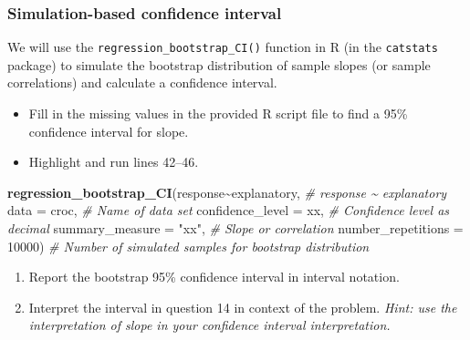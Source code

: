 \documentclass[
]{report}
\newenvironment{Shaded}{\begin{snugshade}}{\end{snugshade}}
\newcommand{\AttributeTok}[1]{\textcolor[rgb]{0.13,0.29,0.53}{#1}}
\newcommand{\CommentTok}[1]{\textcolor[rgb]{0.56,0.35,0.01}{\textit{#1}}}
\newcommand{\DecValTok}[1]{\textcolor[rgb]{0.00,0.00,0.81}{#1}}
\newcommand{\FunctionTok}[1]{\textcolor[rgb]{0.13,0.29,0.53}{\textbf{#1}}}
\newcommand{\NormalTok}[1]{#1}
\newcommand{\SpecialCharTok}[1]{\textcolor[rgb]{0.81,0.36,0.00}{\textbf{#1}}}
\newcommand{\StringTok}[1]{\textcolor[rgb]{0.31,0.60,0.02}{#1}}
\begin{document}
\subsubsection*{Simulation-based confidence interval}\label{simulation-based-confidence-interval-1}

We will use the \texttt{regression\_bootstrap\_CI()} function in R (in the \texttt{catstats} package) to simulate the bootstrap distribution of sample slopes (or sample correlations) and calculate a confidence interval.

\begin{itemize}
\item
  Fill in the missing values in the provided R script file to find a 95\% confidence interval for slope.
\item
  Highlight and run lines 42--46.
\end{itemize}

\begin{Shaded}
\begin{Highlighting}[]
\FunctionTok{regression\_bootstrap\_CI}\NormalTok{(response}\SpecialCharTok{\textasciitilde{}}\NormalTok{explanatory, }\CommentTok{\# response \textasciitilde{} explanatory}
   \AttributeTok{data =}\NormalTok{ croc, }\CommentTok{\# Name of data set}
   \AttributeTok{confidence\_level =}\NormalTok{ xx, }\CommentTok{\# Confidence level as decimal}
   \AttributeTok{summary\_measure =} \StringTok{"xx"}\NormalTok{, }\CommentTok{\# Slope or correlation}
   \AttributeTok{number\_repetitions =} \DecValTok{10000}\NormalTok{) }\CommentTok{\# Number of simulated samples for bootstrap distribution}
\end{Highlighting}
\end{Shaded}

\begin{enumerate}
\def\labelenumi{\arabic{enumi}.}
\setcounter{enumi}{12}
\item
  Report the bootstrap 95\% confidence interval in interval notation.\\
  \vspace{0.5in}
\item
  Interpret the interval in question 14 in context of the problem. \emph{Hint: use the interpretation of slope in your confidence interval interpretation.}
\end{enumerate}

\vspace{0.8in}
\end{document}
